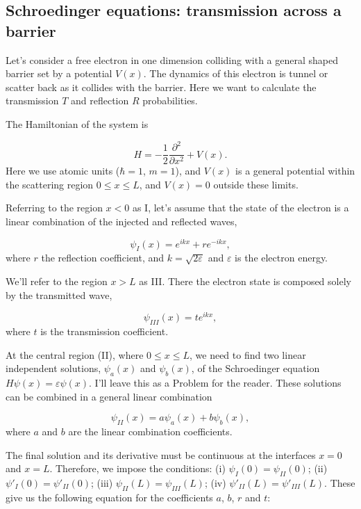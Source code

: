 \subsection{Schroedinger equations: transmission across a barrier}

Let's consider a free electron in one dimension colliding with a general shaped barrier set by a potential $V(x)$. The dynamics of this electron is tunnel or scatter back as it collides with the barrier. Here we want to calculate the transmission $T$ and reflection $R$ probabilities.

The Hamiltonian of the system is

\begin{equation}
 H = -\dfrac{1}{2}\dfrac{\partial^2}{\partial x^2} + V(x).
\end{equation}
Here we use atomic units ($\hbar = 1$, $m=1$), and $V(x)$ is a general potential within the scattering region $0 \leq x \leq L$, and $V(x) = 0$ outside these limits.

Referring to the region $x<0$ as I, let's assume that the state of the electron is a linear combination of the injected and reflected waves,

\begin{equation}
 \psi_I(x) = e^{i k x} + r e^{-i k x},
 \label{eq:psi1}
\end{equation}
where $r$ the reflection coefficient, and $k = \sqrt{2\varepsilon}$ and $\varepsilon$ is the electron energy.

We'll refer to the region $x>L$ as III. There the electron state is composed solely by the transmitted wave,

\begin{equation}
 \psi_{III}(x) = t e^{ikx},
 \label{eq:psi3}
\end{equation}
where $t$ is the transmission coefficient.

At the central region (II), where $0 \leq x \leq L$, we need to find two linear independent solutions, $\psi_a(x)$ and $\psi_b(x)$, of the Schroedinger equation $H\psi(x) = \varepsilon\psi(x)$. I'll leave this as a Problem for the reader. These solutions can be combined in a general linear combination

\begin{equation}
 \psi_{II}(x) = a \psi_a(x) + b \psi_b(x),
 \label{eq:psi2}
\end{equation}
where $a$ and $b$ are the linear combination coefficients.

The final solution and its derivative must be continuous at the interfaces $x=0$ and $x=L$. Therefore, we impose the conditions: (i) $\psi_I(0) = \psi_{II}(0)$; (ii) $\psi'_I(0) = \psi'_{II}(0)$; (iii) $\psi_{II}(L) = \psi_{III}(L)$; (iv) $\psi'_{II}(L) = \psi'_{III}(L)$. These give us the following equation for the coefficients $a$, $b$, $r$ and $t$:

